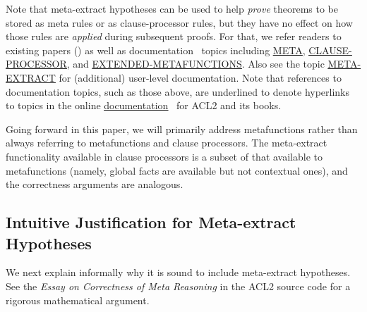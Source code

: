 Note that meta-extract hypotheses can be used to help {\em prove}
theorems to be stored as meta rules or as clause-processor rules, but
they have no effect on how those rules are {\em applied} during
subsequent proofs.  For that, we refer readers to existing papers
(\cite{meta-05,trusted-cl-proc}) as well as
documentation~\cite{acl2:doc} topics including
\href{http://www.cs.utexas.edu/users/moore/acl2/manuals/current/manual/index.html?topic=ACL2\_\_\_\_META}{\underline{META}},
\href{http://www.cs.utexas.edu/users/moore/acl2/manuals/current/manual/index.html?topic=ACL2\_\_\_\_CLAUSE-PROCESSOR}{\underline{CLAUSE-PROCESSOR}},
and
\href{http://www.cs.utexas.edu/users/moore/acl2/manuals/current/manual/index.html?topic=ACL2\_\_\_\_EXTENDED-METAFUNCTIONS}{\underline{EXTENDED-METAFUNCTIONS}}.
Also see the topic
\href{http://www.cs.utexas.edu/users/moore/acl2/manuals/current/manual/index.html?topic=ACL2\_\_\_\_META-EXTRACT}{\underline{META-EXTRACT}}
for (additional) user-level documentation.  Note that references to
documentation topics, such as those above, are underlined to denote
hyperlinks to topics in the online
\href{http://www.cs.utexas.edu/users/moore/acl2/manuals/current/manual/index.html}{\underline{documentation}}~\cite{acl2:doc}
for ACL2 and its books.

Going forward in this paper, we will primarily address metafunctions
rather than always referring to metafunctions and clause processors.
The meta-extract functionality available in clause processors is a
subset of that available to metafunctions (namely, global facts are
available but not contextual ones), and the correctness arguments are
analogous.

\subsection{Intuitive Justification for Meta-extract Hypotheses}
\label{sec:intuitive}

We next explain informally why it is sound to include meta-extract
hypotheses.  See the {\em Essay on Correctness of Meta Reasoning} in
the ACL2 source code for a rigorous mathematical argument.

